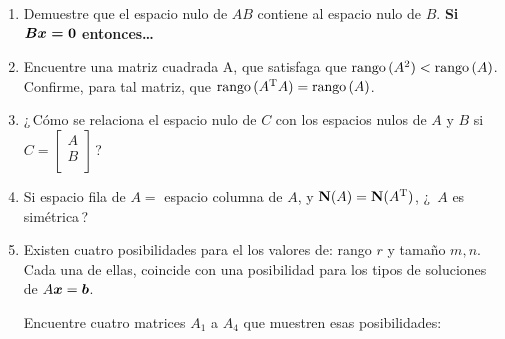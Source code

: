\documentclass[12pt,a4paper]{article}
\newcommand{\bi}[1]{\hbox{\boldmath$#1$}}
\newcommand\1{\mbox{\,\vrule height-0.8pt depth1.0pt width2pc\,}}
\newcommand\2{\mbox{\,\vrule height-0.8pt depth1.0pt width1pc\,}}
\DeclareRobustCommand\transp{^{\mathrm{T}}}
\begin{document}
\begin{enumerate}
\item Demuestre que el espacio nulo de $AB$ contiene al espacio nulo de $B$. \textbf{Si $\bi{Bx=0}$ entonces\ldots}
\item Encuentre una matriz cuadrada A, que satisfaga que $\hbox{rango}\,(A^2)<\hbox{rango}\,(A)$. Confirme, para tal matriz,  que $\hbox{rango}\,(A\transp A)=\hbox{rango}\,(A)$.
\item ¿\,Cómo se relaciona el espacio nulo de $C$ con los espacios nulos de $A$ y $B$ si ${C=\left[\begin{array}{r}A\\B\\\end{array}\right]}$\,?
\item Si espacio fila de $A=$ espacio columna de $A$, y  $\hbox{\textbf{N}}(A)=\hbox{\textbf{N}}(A\transp)$, ¿\ $A$ es simétrica\,?

\item Existen cuatro posibilidades para el los valores de: rango $r$ y tamaño $m,n$. Cada una de ellas, coincide con una posibilidad para los tipos de soluciones de $A\bi{x}=\bi{b}$.

Encuentre cuatro matrices $A_1$ a $A_4$ que muestren esas posibilidades:


\end{enumerate}
\end{document}
